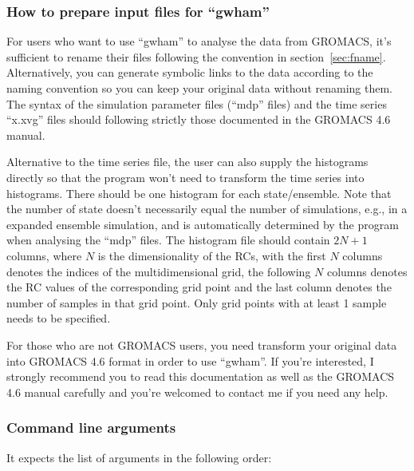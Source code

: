 
\subsubsection{How to prepare input files for ``gwham''}\label{sec:fformat}
For users who want to use ``gwham'' to analyse the data from GROMACS, it's
sufficient to rename their files following the convention in
section~\ref{sec:fname}. Alternatively,  you can generate symbolic links to the
data according to the naming convention so you can keep your original data
without renaming them. The syntax of the simulation parameter files (``mdp''
files) and the time series ``x.xvg'' files should following strictly those
documented in the GROMACS 4.6 manual. 

Alternative to the time series file, the user can also supply the histograms
directly so that the program won't need to transform the time series into
histograms. There should be one histogram for each state/ensemble. Note that
the number of state doesn't necessarily equal the number of simulations, e.g.,
in a expanded ensemble simulation, and is automatically determined by the
program when analysing the ``mdp'' files.  The histogram file should contain
$2N+1$ columns, where $N$ is the dimensionality of the RCs, with the first $N$
columns denotes the indices of the multidimensional grid, the following $N$
columns denotes the RC values of the corresponding grid point and the last
column denotes the number of samples in that grid point. Only grid points with 
at least 1 sample needs to be specified.

For those who are not GROMACS users, you need transform your original data into
GROMACS 4.6 format in order to use ``gwham''. If you're interested, I strongly
recommend you to read this documentation as well as the GROMACS 4.6 manual
carefully and you're welcomed to contact me if you need any help. 

\subsubsection{Command line arguments}
It expects the list of arguments in the following order:


